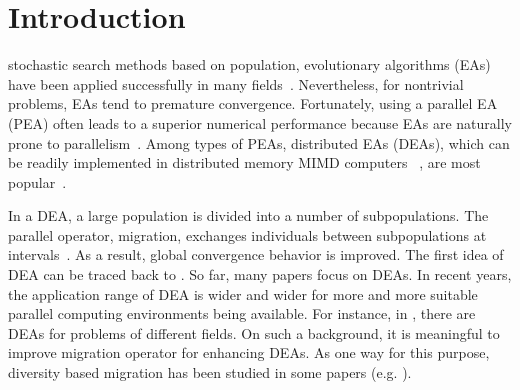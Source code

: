 \documentclass[journal,onecolumn]{IEEEtran}
\begin{document}
\section{Introduction}
 stochastic search methods based on population, evolutionary algorithms (EAs) have been applied successfully in many fields~\cite{alba2002parallelism,wu2013artificial}.
Nevertheless, for nontrivial problems, EAs tend to premature convergence.
Fortunately, using a parallel EA (PEA) often leads to a superior numerical performance because EAs are naturally prone to parallelism~\cite{alba2002parallelism}.
Among types of PEAs, distributed EAs (DEAs), which can be readily implemented in distributed memory MIMD computers~ \cite{alba2002parallelism}, are most popular~\cite{alba2002parallelism,cantu1998survey}.

In a DEA, a large population is divided into a number of subpopulations.
The parallel operator, migration,
exchanges individuals between subpopulations at intervals~\cite{herrera1999hierarchical}.
As a result, global convergence behavior is improved.
The first idea of DEA can be traced back to \cite{bossert1967mathematical}.
So far, many papers focus on DEAs.
In recent years, the application range of DEA is wider and wider for more and more suitable parallel computing environments being available.
For instance, in \cite{tosun2013robust,zidi2013distributed,bulnes2013parallel,rocha2014hybrid,devos2014simultaneous}, there are DEAs for problems of different fields.
On such a background, it is meaningful to improve migration operator for enhancing DEAs.
As one way for this purpose, diversity based migration has been studied in some papers (e.g. \cite{denzinger2003improving,power2005promoting,wei2009maintain,araujo2011diversity}).
\end{document}

